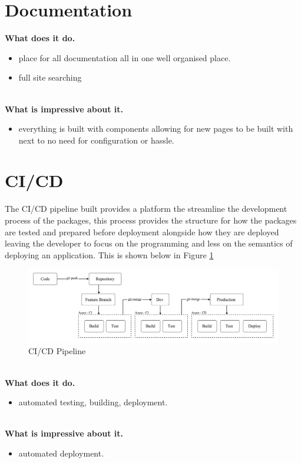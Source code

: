 \documentclass{l4proj}
\begin{document}
\section{Documentation}
\textbf{What does it do.}
\begin{itemize}
    \item place for all documentation all in one well organised place.
    \item full site searching
\end{itemize}
\\
\textbf{What is impressive about it.}
\begin{itemize}
    \item everything is built with components allowing for new pages to be built with next to no need for configuration or hassle.
\end{itemize}
\section{CI/CD}
\text The CI/CD pipeline built provides a platform the streamline the development process of the packages, this process provides the structure for how the packages are tested and prepared before deployment alongside how they are deployed leaving the developer to focus on the programming and less on the semantics of deploying an application. This is shown below in Figure \ref{fig:CICDPipeline}

\begin{figure}[!ht]
    \begin{center}
        
    
    \includegraphics[width=14cm]{dissertation/images/CICD-structure.png}
    \end{center}
    \caption{CI/CD Pipeline}
    \label{fig:CICDPipeline}
\end{figure}
\\
\textbf{What does it do.}
\begin{itemize}
    \item automated testing, building, deployment.
\end{itemize}
\\
\textbf{What is impressive about it.}
\begin{itemize}
    \item automated deployment.
\end{itemize}
\end{document}
